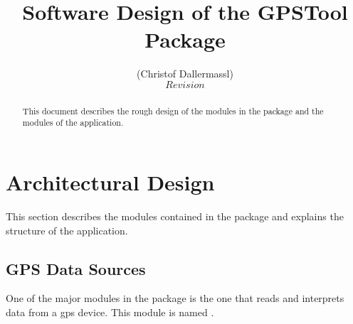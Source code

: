 \documentclass[a4paper]{article} %
\begin{document}
\begin{Form}\end{Form}

\title{Software Design of the GPSTool Package}                     %
\author{(Christof Dallermassl)\\                         %
  $Revision$}                      %


\maketitle

\vspace{1cm}

\begin{abstract}

This document describes the rough design of the modules in the
 package and the modules of the
 application.

\end{abstract}

\newpage

\tableofcontents

\newpage

\section{Architectural Design}
\label{SoftwareDesignOfTheGpstoolPackage-ArchitecturalDesign}

This section describes the modules contained in the
 package and explains the structure
of the  application.

\subsection{GPS Data Sources}
\label{SoftwareDesignOfTheGpstoolPackage-GpsDataSources}

One of the major modules in the 
package is the one that reads and interprets data from a gps
device. This module is named
.
\end{document}
